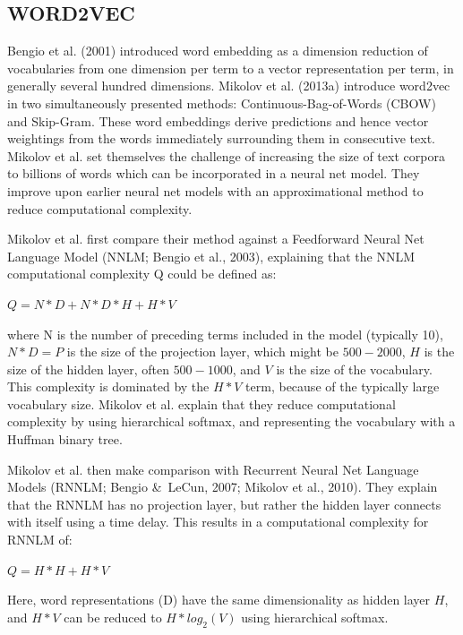 \documentclass[conference]{IEEEtran}
\begin{document}
\subsection{WORD2VEC}
Bengio et al. (2001) introduced word embedding as a dimension reduction of vocabularies from one dimension per term to a vector representation per term, in generally several hundred dimensions. Mikolov et al. (2013a) introduce word2vec in two simultaneously presented methods: Continuous-Bag-of-Words (CBOW) and Skip-Gram. These word embeddings derive predictions and hence vector weightings from the words immediately surrounding them in consecutive text. Mikolov et al. set themselves the challenge of increasing the size of text corpora to billions of words which can be incorporated in a neural net model. They improve upon earlier neural net models with an approximational method to reduce computational complexity.
 
Mikolov et al. first compare their method against a Feedforward Neural Net Language Model (NNLM; Bengio et al., 2003), explaining that the NNLM computational complexity Q could be defined as:
\begin{center}
$Q = N * D + N * D * H + H * V$
\end{center}
where N is the number of preceding terms included in the model (typically 10), $N*D=P$ is the size of the projection layer, which might be $500-2000$, $H$ is the size of the hidden layer, often $500-1000$, and $V$ is the size of the vocabulary. This complexity is dominated by the $H*V$ term, because of the typically large vocabulary size. Mikolov et al. explain that they reduce computational complexity by using hierarchical softmax, and representing the vocabulary with a Huffman binary tree.
 
Mikolov et al. then make comparison with Recurrent Neural Net Language Models (RNNLM; Bengio \&\  LeCun, 2007; Mikolov et al., 2010). They explain that the RNNLM has no projection layer, but rather the hidden layer connects with itself using a time delay. This results in a computational complexity for RNNLM of:
\begin{center}
    $Q = H * H + H * V$\\
\end{center}
Here, word representations (D) have the same dimensionality as hidden layer $H$, and $H * V$ can be reduced to $H*log_2(V)$ using hierarchical softmax.
 
\end{document}
